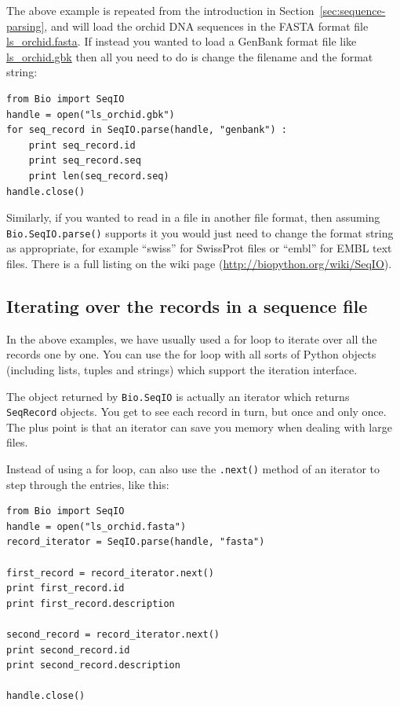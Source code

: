 \documentclass{report}
\begin{document}
The above example is repeated from the introduction in Section~\ref{sec:sequence-parsing}, and will load the orchid DNA sequences in the FASTA format file \href{http://biopython.org/DIST/docs/tutorial/examples/ls_orchid.fasta}{ls\_orchid.fasta}.  If instead you wanted to load a GenBank format file like \href{http://biopython.org/DIST/docs/tutorial/examples/ls_orchid.gbk}{ls\_orchid.gbk} then all you need to do is change the filename and the format string:

\begin{verbatim}
from Bio import SeqIO
handle = open("ls_orchid.gbk")
for seq_record in SeqIO.parse(handle, "genbank") :
    print seq_record.id
    print seq_record.seq
    print len(seq_record.seq)
handle.close()
\end{verbatim}

Similarly, if you wanted to read in a file in another file format, then assuming \verb|Bio.SeqIO.parse()| supports it you would just need to change the format string as appropriate, for example ``swiss'' for SwissProt files or ``embl'' for EMBL text files. There is a full listing on the wiki page (\url{http://biopython.org/wiki/SeqIO}).

\subsection{Iterating over the records in a sequence file}

In the above examples, we have usually used a for loop to iterate over all the records one by one.  You can use the for loop with all sorts of Python objects (including lists, tuples and strings) which support the iteration interface.

The object returned by \verb|Bio.SeqIO| is actually an iterator which returns \verb|SeqRecord| objects.  You get to see each record in turn, but once and only once.  The plus point is that an iterator can save you memory when dealing with large files.

Instead of using a for loop, can also use the \verb|.next()| method of an iterator to step through the entries, like this:

\begin{verbatim}
from Bio import SeqIO
handle = open("ls_orchid.fasta")
record_iterator = SeqIO.parse(handle, "fasta")

first_record = record_iterator.next()
print first_record.id
print first_record.description

second_record = record_iterator.next()
print second_record.id
print second_record.description

handle.close()
\end{verbatim}
\end{document}
